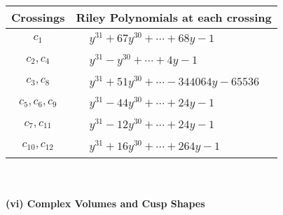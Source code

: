 \documentclass[1p]{elsarticle_modified}
\theoremstyle{definition}
\begin{document}
\begin{tabular}{m{50pt}|m{274pt}}
Crossings & \hspace{64pt}Riley Polynomials at each crossing \\
\hline $$\begin{aligned}c_{1}\end{aligned}$$&$\begin{aligned}
&y^{31}+67 y^{30}+\cdots+68 y-1
\end{aligned}$\\
\hline $$\begin{aligned}c_{2},c_{4}\end{aligned}$$&$\begin{aligned}
&y^{31}- y^{30}+\cdots+4 y-1
\end{aligned}$\\
\hline $$\begin{aligned}c_{3},c_{8}\end{aligned}$$&$\begin{aligned}
&y^{31}+51 y^{30}+\cdots-344064 y-65536
\end{aligned}$\\
\hline $$\begin{aligned}c_{5},c_{6},c_{9}\end{aligned}$$&$\begin{aligned}
&y^{31}-44 y^{30}+\cdots+24 y-1
\end{aligned}$\\
\hline $$\begin{aligned}c_{7},c_{11}\end{aligned}$$&$\begin{aligned}
&y^{31}-12 y^{30}+\cdots+24 y-1
\end{aligned}$\\
\hline $$\begin{aligned}c_{10},c_{12}\end{aligned}$$&$\begin{aligned}
&y^{31}+16 y^{30}+\cdots+264 y-1
\end{aligned}$\\
\hline
\end{tabular}\\~\\
\newpage\flushleft \textbf{(vi) Complex Volumes and Cusp Shapes}
\end{document}
